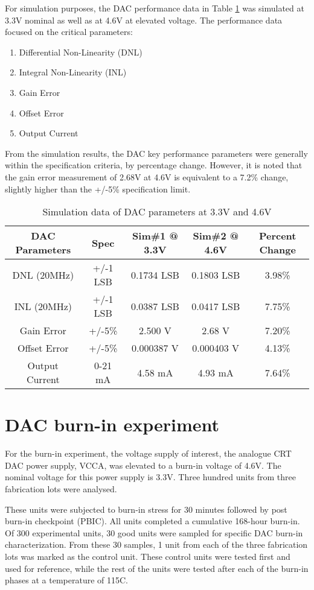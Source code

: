 \documentclass[11pt,a4paper]{article}
\begin{document}
For simulation purposes, the DAC performance data in Table \ref{table 13} was simulated at 3.3V nominal as well as at 4.6V at elevated voltage. The performance data focused on the critical parameters: 
\begin{enumerate}
\item Differential Non-Linearity (DNL)
\item Integral Non-Linearity (INL)
\item Gain Error
\item Offset Error
\item Output Current
\end{enumerate}
From the simulation results, the DAC key performance parameters were generally within the specification criteria, by percentage change. However, it is noted that the gain error measurement of 2.68V at 4.6V is equivalent to a 7.2\% change, slightly higher than the +/-5\% specification limit. 

\begin{table}[t]
\centering
\caption{Simulation data of DAC parameters at 3.3V and 4.6V}
\label{table 13}
\begin{tabular}{|c|c|c|c|c|} \hline
DAC Parameters & Spec & Sim\#1 @ 3.3V & Sim\#2 @ 4.6V & Percent Change\\
\hline
DNL (20MHz)& +/-1 LSB& 0.1734 LSB& 0.1803 LSB& 3.98\%\\
INL (20MHz)& +/-1 LSB&0.0387 LSB&0.0417 LSB&7.75\%\\
Gain Error&+/-5\%&2.500 V&2.68 V&7.20\%\\
Offset Error&+/-5\%&0.000387 V&0.000403 V&4.13\%\\
Output Current&0-21 mA &4.58 mA&4.93 mA&7.64\%\\
\hline
\end{tabular}
\end{table}



\section{DAC burn-in experiment}

For the burn-in experiment, the voltage supply of interest, the analogue CRT DAC power supply, VCCA, was elevated to a burn-in voltage of 4.6V. The nominal voltage for this power supply is 3.3V.  Three hundred units from three fabrication lots were analysed.

These units were subjected to burn-in stress for 30 minutes followed by post burn-in checkpoint (PBIC). All units completed a cumulative 168-hour burn-in. Of 300 experimental units, 30 good units were sampled for specific DAC burn-in characterization. From these 30 samples, 1 unit from each of the three fabrication lots was marked as the control unit. These control units were tested first and used for reference, while the rest of the units were tested after each of the burn-in phases at a temperature of 115C.
\end{document}
